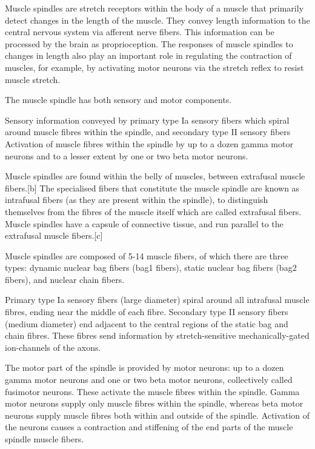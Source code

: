 \documentclass[]{book}
\begin{document}
Muscle spindles are stretch receptors within the body of a muscle that primarily detect changes in the length of the muscle. They convey length information to the central nervous system via afferent nerve fibers. This information can be processed by the brain as proprioception. The responses of muscle spindles to changes in length also play an important role in regulating the contraction of muscles, for example, by activating motor neurons via the stretch reflex to resist muscle stretch.

The muscle spindle has both sensory and motor components.

Sensory information conveyed by primary type Ia sensory fibers which spiral around muscle fibres within the spindle, and secondary type II sensory fibers
Activation of muscle fibres within the spindle by up to a dozen gamma motor neurons and to a lesser extent by one or two beta motor neurons.

Muscle spindles are found within the belly of muscles, between extrafusal muscle fibers.{[}b{]} The specialised fibers that constitute the muscle spindle are known as intrafusal fibers (as they are present within the spindle), to distinguish themselves from the fibres of the muscle itself which are called extrafusal fibers. Muscle spindles have a capsule of connective tissue, and run parallel to the extrafusal muscle fibers.{[}c{]}

Muscle spindles are composed of 5-14 muscle fibers, of which there are three types: dynamic nuclear bag fibers (bag1 fibers), static nuclear bag fibers (bag2 fibers), and nuclear chain fibers.

Primary type Ia sensory fibers (large diameter) spiral around all intrafusal muscle fibres, ending near the middle of each fibre. Secondary type II sensory fibers (medium diameter) end adjacent to the central regions of the static bag and chain fibres. These fibres send information by stretch-sensitive mechanically-gated ion-channels of the axons.

The motor part of the spindle is provided by motor neurons: up to a dozen gamma motor neurons and one or two beta motor neurons, collectively called fusimotor neurons. These activate the muscle fibres within the spindle. Gamma motor neurons supply only muscle fibres within the spindle, whereas beta motor neurons supply muscle fibres both within and outside of the spindle. Activation of the neurons causes a contraction and stiffening of the end parts of the muscle spindle muscle fibers.
\end{document}
